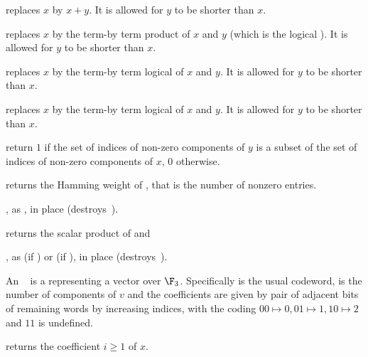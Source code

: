 


 replaces $x$ by $x+y$. It is
allowed for $y$ to be shorter than $x$.

 replaces $x$ by the term-by term product
of $x$ and $y$ (which is the logical ). It is allowed for $y$ to be
shorter than $x$.

 replaces $x$ by the term-by term
logical  of $x$ and $y$. It is allowed for $y$ to be
shorter than $x$.

 replaces $x$ by the term-by term
logical  of $x$ and $y$. It is allowed for $y$ to be
shorter than $x$.

 return $1$ if the set of indices of
non-zero components of $y$ is a subset of the set of indices of
non-zero components of $x$, $0$ otherwise.

 returns the Hamming weight of , that is
the number of nonzero entries.


, as , in place (destroys~).


 returns the scalar product of 
and 



, as  (if
) or  (if ), in place
(destroys~).

  An ~ is a
 representing a vector over $\F_3$. Specifically  is
the usual codeword,  is the number of components of $v$ and the
coefficients are given by pair of adjacent bits of remaining words by
increasing indices, with the coding $00\mapsto 0, 01\mapsto 1, 10\mapsto 2$ and
$11$ is undefined.

 returns the coefficient $i\ge 1$ of $x$.

